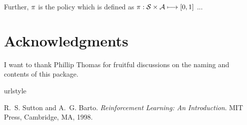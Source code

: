 \documentclass[a4paper, 11pt]{article}
\begin{document}
Further, $\pi$ is the policy which is defined as $\pi : \mathcal{S} \times \mathcal{A} \longmapsto [0, 1]$ ...


\section{Acknowledgments}
\label{sec:thanks}
I want to thank Phillip Thomas for fruitful discussions on the naming and contents of this package.



\begin{thebibliography}{1}
\providecommand{\natexlab}[1]{#1}
\providecommand{\url}[1]{\texttt{#1}}
\expandafter\ifx\csname urlstyle\endcsname\relax
  \providecommand{\doi}[1]{doi: #1}\else
  \providecommand{\doi}{doi: \begingroup \urlstyle{rm}\Url}\fi

R.~S. Sutton and A.~G. Barto.
\newblock \emph{Reinforcement Learning: {A}n Introduction}.
\newblock MIT Press, Cambridge, MA, 1998.

\end{thebibliography}

\end{document}
